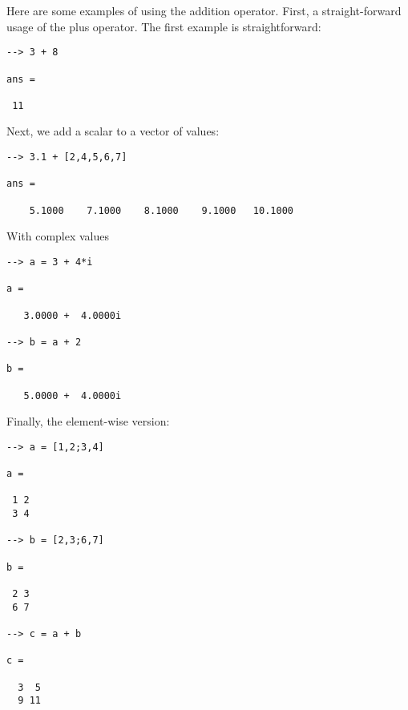 Here are some examples of using the addition operator.  First, a 
straight-forward usage of the plus operator.  The first example
is straightforward:
\begin{verbatim}
--> 3 + 8

ans = 

 11 
\end{verbatim}
Next, we add a scalar to a vector of values:
\begin{verbatim}
--> 3.1 + [2,4,5,6,7]

ans = 

    5.1000    7.1000    8.1000    9.1000   10.1000 
\end{verbatim}
With complex values
\begin{verbatim}
--> a = 3 + 4*i

a = 

   3.0000 +  4.0000i 

--> b = a + 2

b = 

   5.0000 +  4.0000i 
\end{verbatim}
Finally, the element-wise version:
\begin{verbatim}
--> a = [1,2;3,4]

a = 

 1 2 
 3 4 

--> b = [2,3;6,7]

b = 

 2 3 
 6 7 

--> c = a + b

c = 

  3  5 
  9 11 
\end{verbatim}
